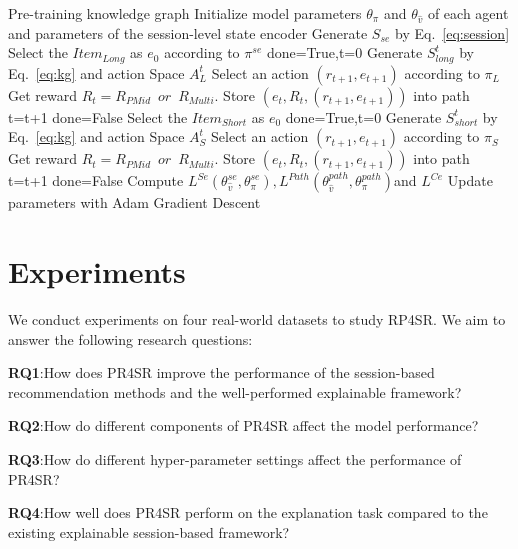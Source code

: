 \documentclass[10pt,journal,compsoc]{IEEEtran}
\begin{document}
\begin{algorithm}[tb]
\caption{Overview of the PR4SR Framwork}
\label{alg:algorithm}
\begin{algorithmic}[1] %
\STATE Pre-training knowledge graph
\STATE Initialize model parameters $\theta_\pi$ and $\theta_{\hat v}$ of each agent and parameters of the session-level state encoder
\STATE Generate $S_{se}$ by Eq.~\ref{eq:session}
\STATE Select the $Item_{Long}$ as $e_0$ according to $\pi^{se}$ 
\STATE done=True,\enspace t=0
\STATE Generate $S_{long}^t$ by Eq.~\ref{eq:kg} and action Space $A_L^t$
\STATE Select an action $(r_{t+1},e_{t+1})$ according to $\pi_{L}$
\STATE Get reward $R_{t}= R_{PMid}\enspace or \enspace R_{Multi}$.
\STATE Store $(e_t,R_t,(r_{t+1},e_{t+1}))$ into path
\STATE t=t+1
\STATE done=False
\ENDIF
\ENDWHILE 
\STATE Select the $Item_{Short}$ as $e_0$
\STATE done=True,\enspace t=0
\STATE Generate $S_{short}^t$ by Eq.~\ref{eq:kg} and action Space $A_S^t$
\STATE Select an action $(r_{t+1},e_{t+1})$ according to $\pi_{S}$
\STATE Get reward $R_{t}= R_{PMid}\enspace or \enspace R_{Multi}$.
\STATE Store $(e_t,R_t,(r_{t+1},e_{t+1}))$ into path
\STATE t=t+1 
\STATE done=False
\ENDIF
\ENDWHILE
\STATE Compute $L^{Se}(\theta_{\hat{v}}^{se},\theta_{\pi}^{se}),L^{Path}(\theta_{\hat{v}}^{path},\theta_{\pi}^{path})$\enspace and $L^{Ce}$
\STATE Update parameters with Adam Gradient Descent
\ENDFOR
\end{algorithmic}
\end{algorithm}





\section{Experiments}
We conduct experiments on four real-world datasets to study RP4SR. We aim to answer the following research questions:

\textbf{RQ1}:\enspace How does PR4SR improve the performance of the session-based recommendation methods and the well-performed explainable framework?

\textbf{RQ2}:\enspace How do different components of PR4SR affect the model performance?

\textbf{RQ3}:\enspace How do different hyper-parameter settings affect the performance of PR4SR?

\textbf{RQ4}:\enspace How well does PR4SR perform on the explanation task compared to the existing explainable session-based framework?
\end{document}
